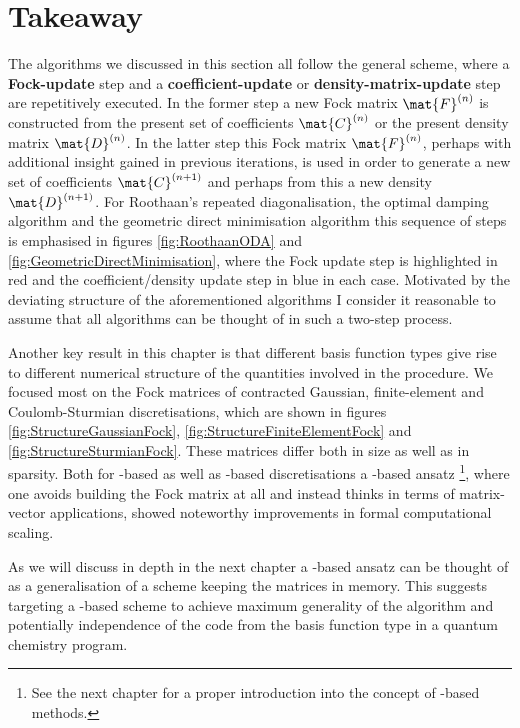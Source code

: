 \section{Takeaway}
\label{sec:SCFtakeaway}
The \SCF algorithms we discussed in this section all follow the general scheme,
where a \textbf{Fock-update} step and
a \textbf{coefficient-update} or \textbf{density-matrix-update}
step are repetitively executed.
In the former step a new Fock matrix $\mat{F}^{(n)}$ is constructed from
the present set of \SCF coefficients $\mat{C}^{(n)}$
or the present density matrix $\mat{D}^{(n)}$.
In the latter step this Fock matrix $\mat{F}^{(n)}$,
perhaps with additional insight gained in previous iterations,
is used in order to generate a new set of coefficients $\mat{C}^{(n+1)}$
and perhaps from this a new density $\mat{D}^{(n+1)}$.
For Roothaan's repeated diagonalisation,
the optimal damping algorithm and the geometric direct minimisation algorithm
this sequence of steps is emphasised in figures
\vref{fig:RoothaanODA} and \vref{fig:GeometricDirectMinimisation},
where the Fock update step is highlighted in red
and the coefficient/density update step in blue in each case.
Motivated by the deviating structure of the aforementioned
algorithms I consider it reasonable
to assume that all \SCF algorithms can be thought of in such
a two-step process.

Another key result in this chapter is
that different basis function types give rise to
different numerical structure
of the quantities involved in the \SCF procedure.
We focused most on the Fock matrices
of contracted Gaussian, finite-element and Coulomb-Sturmian discretisations,
which are shown in figures
\vref{fig:StructureGaussianFock},
\vref{fig:StructureFiniteElementFock}
and \vref{fig:StructureSturmianFock}.
These matrices differ both in size as well as in sparsity.
Both for \FE-based as well as \CS-based
discretisations a \contraction-based ansatz%
\footnote{See the next chapter for a proper introduction into the concept
of \contraction-based methods.},
where one avoids building the Fock matrix at all
and instead thinks in terms of matrix-vector applications,
showed noteworthy improvements in formal computational scaling.

As we will discuss in depth in the next chapter
a \contraction-based ansatz can be thought of as a generalisation
of a scheme keeping the matrices in memory.
This suggests targeting a \contraction-based \SCF scheme to achieve
maximum generality of the \SCF algorithm
and potentially independence of the \SCF code from
the basis function type in a quantum chemistry program.

